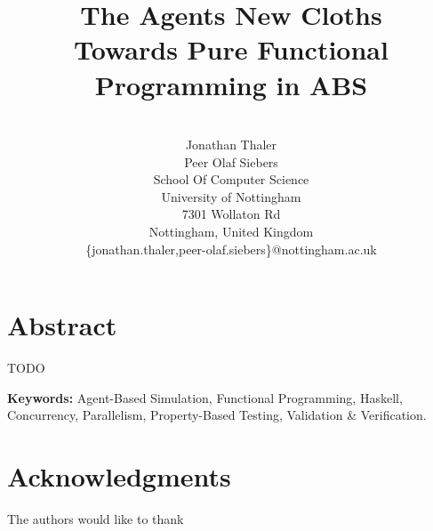 \documentclass{scspaperproc}
\begin{document}


\title{The Agents New Cloths \\ \small{Towards Pure Functional Programming in ABS}}

\author{
\\%
Jonathan Thaler \\ 
Peer Olaf Siebers \\ [12pt] 
School Of Computer Science \\
University of Nottingham \\
7301 Wollaton Rd \\
Nottingham, United Kingdom \\
\{jonathan.thaler,peer-olaf.siebers\}@nottingham.ac.uk\\
}

\maketitle

\section*{Abstract}

TODO

\textbf{Keywords:} Agent-Based Simulation, Functional Programming, Haskell, Concurrency, Parallelism, Property-Based Testing, Validation \& Verification.

\maketitle











\section*{Acknowledgments}
The authors would like to thank




\end{document}
